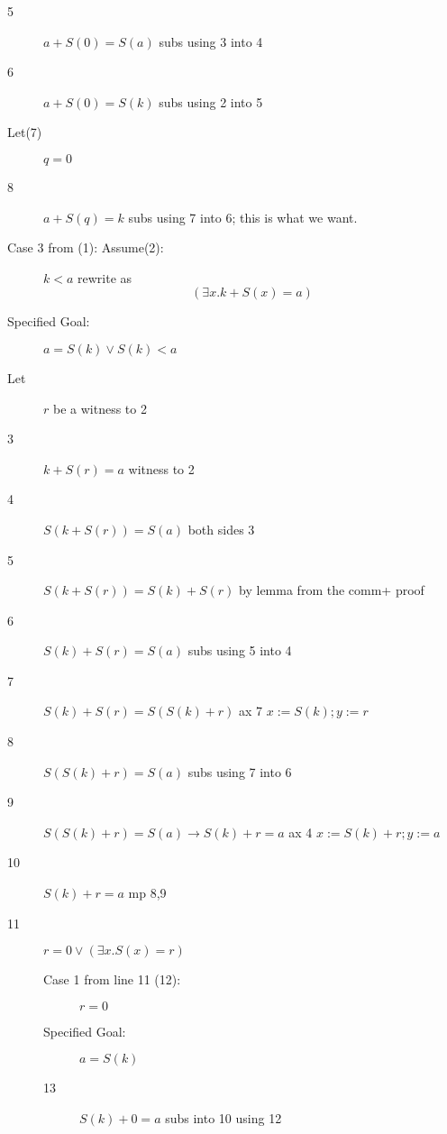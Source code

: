 \documentclass[12pt]{article}
\begin{document}
\begin{description}
\begin{description}
\begin{description}
\begin{description}
\item[5]  $a+S(0)=S(a)$  subs using 3 into 4

\item[6]  $a+S(0)=S(k)$  subs using 2 into 5

\item[Let(7)]  $q=0$

\item[8]  $a+S(q)=k$   subs using 7 into 6; this is what we want.





\item[Case 3 from (1): Assume(2):] $k<a$  rewrite as $$(\exists x.k+S(x)=a)$$

\item[Specified Goal:]  $a=S(k)\vee S(k)<a$

\item[Let] $r$ be a witness to 2

\item[3]  $k+S(r)=a$  witness to 2

\item[4]  $S(k+S(r)) = S(a)$  both sides 3

\item[5] $S(k+S(r)) = S(k)+S(r)$  by lemma from the comm+ proof

\item[6]  $S(k)+S(r)=S(a)$ subs using 5 into 4

\item[7]  $S(k)+S(r) = S(S(k)+r)$  ax 7 $x:=S(k);y:=r$

\item[8]  $S(S(k)+r) = S(a)$  subs using 7 into 6

\item[9]  $S(S(k)+r) = S(a)\rightarrow S(k)+r=a$  ax 4 $x:=S(k)+r; y:=a$

\item[10]  $S(k)+r=a$  mp 8,9

\item[11]  $r=0 \vee (\exists x.S(x)=r)$ 

\begin{description}

\item[Case 1 from line 11 (12):]  $r=0$

\item[Specified Goal:]  $a=S(k)$

\item[13]  $S(k)+0=a$  subs into 10 using 12


\end{description}
\end{description}
\end{description}
\end{description}
\end{description}
\end{document}
